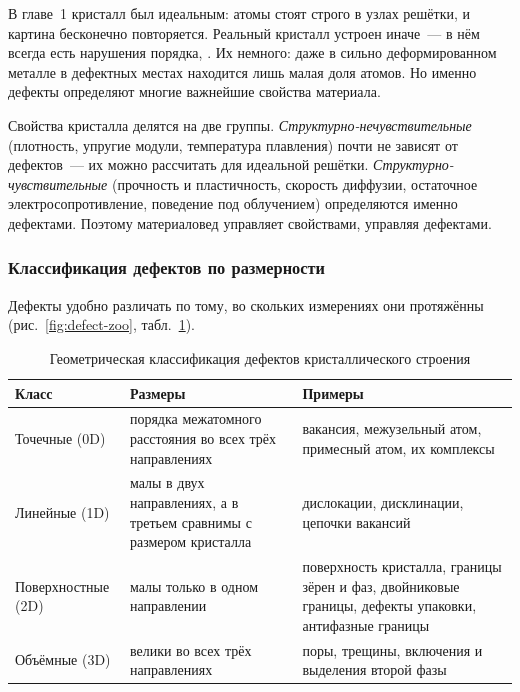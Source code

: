 В главе~1 кристалл был идеальным: атомы стоят строго в узлах решётки,
и картина бесконечно повторяется. Реальный кристалл устроен иначе~— в
нём всегда есть нарушения порядка, . Их немного: даже в
сильно деформированном металле в дефектных местах находится лишь малая
доля атомов. Но именно дефекты определяют многие важнейшие свойства
материала.

\begin{glavnoe}
Свойства кристалла делятся на две группы.
\emph{Структурно-нечувствительные} (плотность, упругие модули, температура
плавления) почти не зависят от дефектов~— их можно рассчитать для
идеальной решётки. \emph{Структурно-чувствительные} (прочность и
пластичность, скорость диффузии, остаточное электросопротивление,
поведение под облучением) определяются именно дефектами. Поэтому
материаловед управляет свойствами, управляя дефектами.
\end{glavnoe}

\subsubsection*{Классификация дефектов по размерности}

Дефекты удобно различать по тому, во скольких измерениях они протяжённы
(рис.~\ref{fig:defect-zoo}, табл.~\ref{tab:defect-classes}).

\begin{table}[ht]
\centering
\caption{Геометрическая классификация дефектов кристаллического строения}
\label{tab:defect-classes}
\small
\begin{tabularx}{\textwidth}{@{}l>{\raggedright\arraybackslash}X>{\raggedright\arraybackslash}X@{}}
\toprule
\textbf{Класс} & \textbf{Размеры} & \textbf{Примеры} \\
\midrule
Точечные (0D) & порядка межатомного расстояния во всех трёх
  направлениях & вакансия, межузельный атом, примесный атом, их
  комплексы \\
Линейные (1D) & малы в двух направлениях, а в третьем сравнимы с
  размером кристалла & дислокации, дисклинации, цепочки вакансий \\
Поверхностные (2D) & малы только в одном направлении &
  поверхность кристалла, границы зёрен и фаз, двойниковые границы,
  дефекты упаковки, антифазные границы \\
Объёмные (3D) & велики во всех трёх направлениях & поры, трещины,
  включения и выделения второй фазы \\
\bottomrule
\end{tabularx}
\end{table}

